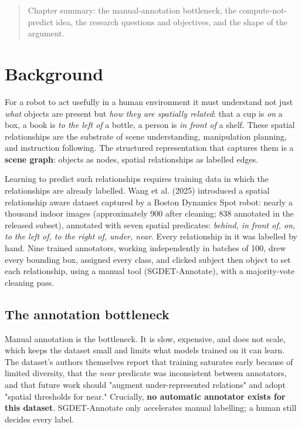 
\begin{quote}
Chapter summary: the manual-annotation bottleneck, the compute-not-predict idea, the research questions and objectives, and the shape of the argument.
\end{quote}

\section{Background}

For a robot to act usefully in a human environment it must understand not just \textit{what} objects are present but \textit{how they are spatially related}: that a cup is \textit{on} a box, a book is \textit{to the left of} a bottle, a person is \textit{in front of} a shelf. These spatial relationships are the substrate of scene understanding, manipulation planning, and instruction following. The structured representation that captures them is a \textbf{scene graph}: objects as nodes, spatial relationships as labelled edges.

Learning to predict such relationships requires training data in which the relationships are already labelled. Wang et al. (2025) introduced a spatial relationship aware dataset captured by a Boston Dynamics Spot robot: nearly a thousand indoor images (approximately 900 after cleaning; 838 annotated in the released subset), annotated with seven spatial predicates: \textit{behind, in front of, on, to the left of, to the right of, under, near}. Every relationship in it was labelled by hand. Nine trained annotators, working independently in batches of 100, drew every bounding box, assigned every class, and clicked subject then object to set each relationship, using a manual tool (SGDET-Annotate), with a majority-vote cleaning pass.

\subsection{The annotation bottleneck}

Manual annotation is the bottleneck. It is slow, expensive, and does not scale, which keeps the dataset small and limits what models trained on it can learn. The dataset's authors themselves report that training saturates early because of limited diversity, that the \textit{near} predicate was inconsistent between annotators, and that future work should "augment under-represented relations" and adopt "spatial thresholds for near." Crucially, \textbf{no automatic annotator exists for this dataset}. SGDET-Annotate only accelerates manual labelling; a human still decides every label.

